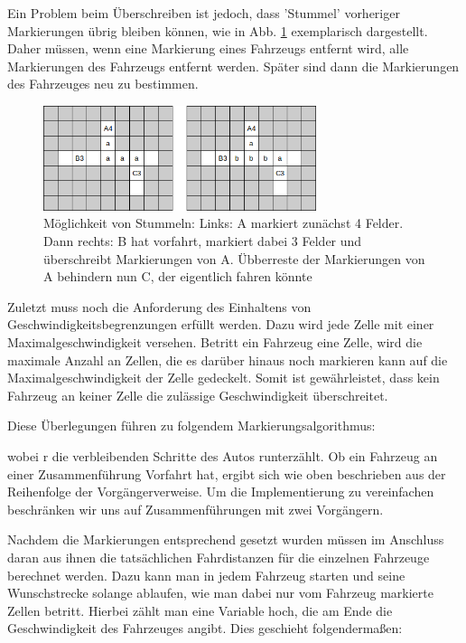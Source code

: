 \documentclass[11pt, a4paper]{article}
\begin{document}
Ein Problem beim Überschreiben ist jedoch, dass 'Stummel' vorheriger Markierungen übrig bleiben können, wie in Abb. \ref{fig:overwritingCanCauseStubs} exemplarisch dargestellt. Daher müssen, wenn eine Markierung eines Fahrzeugs entfernt wird, alle Markierungen des Fahrzeugs entfernt werden. Später sind dann die Markierungen des Fahrzeuges neu zu bestimmen.
\begin{figure}[h!]
	\centering
	\includegraphics[width=8cm]{img/stubs}
	\caption{Möglichkeit von Stummeln: Links: A markiert zunächst 4 Felder. Dann rechts: B hat vorfahrt, markiert dabei 3 Felder und überschreibt Markierungen von A. Übberreste der Markierungen von A behindern nun C, der eigentlich fahren könnte}
	\label{fig:overwritingCanCauseStubs}
\end{figure}

Zuletzt muss noch die Anforderung des Einhaltens von Geschwindigkeitsbegrenzungen erfüllt werden. Dazu wird jede Zelle mit einer Maximalgeschwindigkeit versehen. Betritt ein Fahrzeug eine Zelle, wird die maximale Anzahl an Zellen, die es darüber hinaus noch markieren kann auf die Maximalgeschwindigkeit der Zelle gedeckelt. Somit ist gewährleistet, dass kein Fahrzeug an keiner Zelle die zulässige Geschwindigkeit überschreitet.

Diese Überlegungen führen zu folgendem Markierungsalgorithmus:

wobei r die verbleibenden Schritte des Autos runterzählt. Ob ein Fahrzeug an einer Zusammenführung Vorfahrt hat, ergibt sich wie oben beschrieben aus der Reihenfolge der Vorgängerverweise. Um die Implementierung zu vereinfachen beschränken wir uns auf Zusammenführungen mit zwei Vorgängern.

Nachdem die Markierungen entsprechend gesetzt wurden müssen im Anschluss daran aus ihnen die tatsächlichen Fahrdistanzen für die einzelnen Fahrzeuge berechnet werden. Dazu kann man in jedem Fahrzeug starten und seine Wunschstrecke solange ablaufen, wie man dabei nur vom Fahrzeug markierte Zellen betritt. Hierbei zählt man eine Variable hoch, die am Ende die Geschwindigkeit des Fahrzeuges angibt. Dies geschieht folgendermaßen:\\
\end{document}
